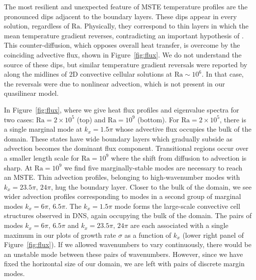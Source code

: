 \documentclass[reprint,amsmath,amssymb,aps]{revtex4-1}
\newcommand\Ra{\mathrm{Ra}}
\begin{document}
The most resilient and unexpected feature of MSTE temperature profiles are the pronounced dips adjacent to the boundary layers. 
These dips appear in every solution, regardless of $\Ra$. 
Physically, they correspond to thin layers in which the mean temperature gradient reverses, contradicting an important hypothesis of \cite{Malkus_1954,Howard_1966}. 
This counter-diffusion, which opposes overall heat transfer, is overcome by the coinciding advective flux, shown in Figure~\ref{fig:flux}. 
We do not understand the source of these dips, but similar temperature gradient reversals were reported by \cite{chini_cells} along the midlines of 2D convective cellular solutions at $\Ra \sim 10^6$.
In that case, the reversals were due to nonlinear advection, which is not present in our quasilinear model. 

In Figure~\ref{fig:flux}, where we give heat flux profiles and eigenvalue spectra for two cases: $\Ra = 2 \times 10^5$ (top) and $\Ra = 10^9$ (bottom). 
For $\Ra = 2 \times 10^5$, there is a single marginal mode at $k_x = 1.5\pi$ whose advective flux occupies the bulk of the domain. 
These states have wide boundary layers which gradually subside as advection becomes the dominant flux component. 
Transitional regions occur over a smaller length scale for $\Ra = 10^9$ where the shift from diffusion to advection is sharp.
At $\Ra=10^9$ we find five marginally-stable modes are necessary to reach an MSTE.
Thin advection profiles, belonging to high-wavenumber modes with $k_x=23.5\pi, \, 24\pi$, hug the boundary layer. 
Closer to the bulk of the domain, we see wider advection profiles corresponding to modes in a second group of marginal modes $k_x = 6\pi, \, 6.5\pi$.
The $k_x = 1.5\pi$ mode forms the large-scale convective cell structures observed in DNS, again occupying the bulk of the domain.
The pairs of modes $k_x = 6\pi, \, 6.5\pi$ and $k_x=23.5\pi, \, 24\pi$ are each associated with a single maximum in our plots of growth rate $\sigma$ as a function of $k_x$ (lower right panel of Figure~\ref{fig:flux}).
If we allowed wavenumbers to vary continuously, there would be an unstable mode between these pairs of wavenumbers.
However, since we have fixed the horizontal size of our domain, we are left with pairs of discrete margin modes.
\end{document}
